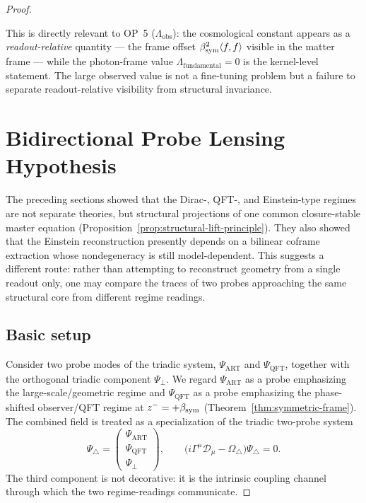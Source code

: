 \begin{proof}
\begin{remark}
This is directly relevant to OP~5 ($\Lambda_{\mathrm{obs}}$): the
cosmological constant appears as a \emph{readout-relative} quantity ---
the frame offset $\beta_{\mathrm{sym}}^2\langle f,f\rangle$ visible in the matter frame
--- while the photon-frame value $\Lambda_{\mathrm{fundamental}} = 0$
is the kernel-level statement. The large observed value is not a
fine-tuning problem but a failure to separate readout-relative visibility
from structural invariance.
\end{remark}


\section{Bidirectional Probe Lensing Hypothesis}
\label{sec:bidirectional-probe-lensing}

The preceding sections showed that the Dirac-, QFT-, and Einstein-type
regimes are not separate theories, but structural projections of one
common closure-stable master equation
(Proposition~\ref{prop:structural-lift-principle}). They also showed
that the Einstein reconstruction presently depends on a bilinear coframe
extraction whose nondegeneracy is still model-dependent. This suggests a
different route: rather than attempting to reconstruct geometry from a
single readout only, one may compare the traces of two probes approaching
the same structural core from different regime readings.

\subsection*{Basic setup}

Consider two probe modes of the triadic system,
$\Psi_{\mathrm{ART}}$ and $\Psi_{\mathrm{QFT}}$,
together with the orthogonal triadic component $\Psi_\perp$.
We regard $\Psi_{\mathrm{ART}}$ as a probe emphasizing the
large-scale/geometric regime and $\Psi_{\mathrm{QFT}}$ as a probe
emphasizing the phase-shifted observer/QFT regime at
$z^- = +\beta_{\mathrm{sym}}$ (Theorem~\ref{thm:symmetric-frame}).
The combined field is treated as a specialization of the triadic
two-probe system
\[
  \Psi_{\triangle}
  =
  \begin{pmatrix}
    \Psi_{\mathrm{ART}}\\
    \Psi_{\mathrm{QFT}}\\
    \Psi_\perp
  \end{pmatrix},
  \qquad
  \bigl(i\Gamma^\mu\mathcal{D}_\mu - \Omega_\triangle\bigr)
  \Psi_\triangle = 0.
\]
The third component is not decorative: it is the intrinsic coupling
channel through which the two regime-readings communicate.


\end{proof}
